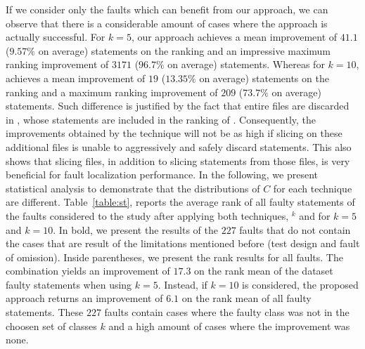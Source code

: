 \documentclass{article}
\begin{document}
If we consider only the faults which can benefit from our approach, we can observe that there is a considerable
amount of cases where the approach is actually successful. For
$k=5$, our approach achieves a mean improvement of $41.1$ ($9.57\%$ on average) statements
on the ranking and an impressive maximum ranking improvement
of $3171$ ($96.7\%$ on average) statements. Whereas for $k=10$, 
achieves a mean improvement of $19$ ($13.35\%$ on average) statements
on the ranking and a maximum ranking improvement
of $209$ ($73.7\%$ on average) statements. Such difference is justified by the fact that
entire files are discarded in , whose statements are
included in the ranking of . Consequently, the
improvements obtained by the technique will not be as high if slicing
on these additional files is unable to aggressively and safely discard
statements. This also shows that slicing files, in addition to slicing
statements from those files, is very beneficial for fault localization
performance.
In the following, we present statistical analysis to demonstrate that
the distributions of $C$ for each technique are different.
Table~\ref{table:st}, reports the average rank of all faulty
statements of the \dfj{} faults considered to the study after applying both
techniques, \sfl{}$^{k}$ and  for $k=5$ and $k=10$. 
In bold, we present the results of the $227$ faults that do not contain the 
cases that are result of the limitations mentioned before (test design and fault of omission). Inside parentheses, we present the
rank results for all faults. The  combination yields an improvement
of $17.3$ on the rank mean of the dataset faulty statements when using $k=5$.
Instead, if $k=10$ is considered, the proposed approach returns an improvement of
$6.1$ on the rank mean of all faulty statements.
These $227$ faults contain cases where the faulty class was not in the choosen 
set of classes $k$ and a high amount of cases where the improvement was none.
\end{document}
